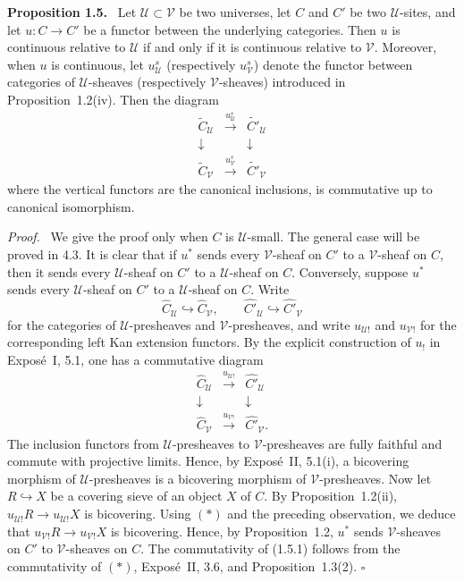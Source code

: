 \documentclass[11pt]{article}
\newcommand{\U}{\mathcal{U}}
\newcommand{\V}{\mathcal{V}}
\newcommand{\qedtext}{\hfill\(\square\)}
\newenvironment{statement}[1]{\par\medskip\noindent\textbf{#1.}\ }{\par\medskip}
\newenvironment{prooftext}{\par\noindent\emph{Proof.}\ }{\par\medskip}
\begin{document}
\begin{statement}{Proposition 1.5}
Let \(\U\subset\V\) be two universes, let \(C\) and \(C'\) be two \(\U\)-sites, and let \(u:C\to C'\) be a functor between the underlying categories. Then \(u\) is continuous relative to \(\U\) if and only if it is continuous relative to \(\V\). Moreover, when \(u\) is continuous, let \(u^s_{\U}\) (respectively \(u^s_{\V}\)) denote the functor between categories of \(\U\)-sheaves (respectively \(\V\)-sheaves) introduced in Proposition~1.2(iv). Then the diagram
\[
\begin{array}{ccc}
\widetilde C_{\U} & \xrightarrow{u^s_{\U}} & \widetilde{C'}_{\U}\\
\downarrow && \downarrow\\
\widetilde C_{\V} & \xrightarrow{u^s_{\V}} & \widetilde{C'}_{\V}
\end{array}
\tag{1.5.1}
\]
where the vertical functors are the canonical inclusions, is commutative up to canonical isomorphism.
\end{statement}

\begin{prooftext}
We give the proof only when \(C\) is \(\U\)-small. The general case will be proved in 4.3. It is clear that if \(u^*\) sends every \(\V\)-sheaf on \(C'\) to a \(\V\)-sheaf on \(C\), then it sends every \(\U\)-sheaf on \(C'\) to a \(\U\)-sheaf on \(C\). Conversely, suppose \(u^*\) sends every \(\U\)-sheaf on \(C'\) to a \(\U\)-sheaf on \(C\). Write
\[
\widehat C_{\U}\hookrightarrow\widehat C_{\V},
\qquad
\widehat{C'}_{\U}\hookrightarrow\widehat{C'}_{\V}
\]
for the categories of \(\U\)-presheaves and \(\V\)-presheaves, and write \(u_{\U!}\) and \(u_{\V!}\) for the corresponding left Kan extension functors. By the explicit construction of \(u_!\) in Expos\'e~I, 5.1, one has a commutative diagram
\[
\begin{array}{ccc}
\widehat C_{\U} & \xrightarrow{u_{\U!}} & \widehat{C'}_{\U}\\
\downarrow && \downarrow\\
\widehat C_{\V} & \xrightarrow{u_{\V!}} & \widehat{C'}_{\V}.
\end{array}
\tag{*}
\]
The inclusion functors from \(\U\)-presheaves to \(\V\)-presheaves are fully faithful and commute with projective limits. Hence, by Expos\'e~II, 5.1(i), a bicovering morphism of \(\U\)-presheaves is a bicovering morphism of \(\V\)-presheaves. Now let \(R\hookrightarrow X\) be a covering sieve of an object \(X\) of \(C\). By Proposition~1.2(ii), \(u_{\U!}R\to u_{\U!}X\) is bicovering. Using \((*)\) and the preceding observation, we deduce that \(u_{\V!}R\to u_{\V!}X\) is bicovering. Hence, by Proposition~1.2, \(u^*\) sends \(\V\)-sheaves on \(C'\) to \(\V\)-sheaves on \(C\). The commutativity of (1.5.1) follows from the commutativity of \((*)\), Expos\'e~II, 3.6, and Proposition~1.3(2). \qedtext
\end{prooftext}
\end{document}
